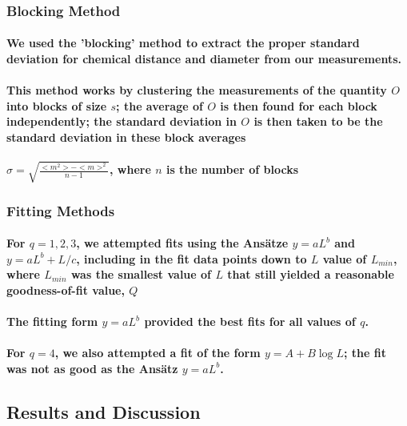\documentclass{umthesis}
\begin{document}
\subsubsection{Blocking Method}
\label{sec-3.2.6.1}
\paragraph{We used the 'blocking' method \cite{NeBa99} to extract the proper standard deviation for chemical distance and diameter from our measurements.}
\label{sec-3.2.6.1.1}
\paragraph{This method works by clustering the measurements of the quantity $O$ into blocks of size $s$; the average of $O$ is then found for each block independently;  the standard deviation in $O$ is then taken to be the standard deviation in these block averages}
\label{sec-3.2.6.1.2}
\paragraph{$\sigma=\sqrt{ \frac{< m^2 > - < m >  ^2}{n-1}}$, where $n$ is the number of blocks}
\label{sec-3.2.6.1.3}
\subsubsection{Fitting Methods}
\label{sec-3.2.6.2}
\paragraph{For $q=1,2,3$, we attempted fits using the Ans\"{a}tze $y=aL^b$ and $y=aL^b+L/c$, including in the fit data points down to $L$ value of $L_{min}$, where $L_{min}$ was the smallest value of $L$ that still yielded a reasonable goodness-of-fit value, $Q$}
\label{sec-3.2.6.2.1}
\paragraph{The fitting form $y=aL^b$ provided the best fits for all values of $q$.}
\label{sec-3.2.6.2.2}
\paragraph{For $q=4$, we also attempted a fit of the form $y=A+B \log L$; the fit was not as good as the Ans\"{a}tz $y=aL^b$.}
\label{sec-3.2.6.2.3}
\subsection{Results and Discussion}
\label{sec-3.2.7}
\end{document}

